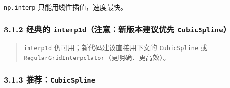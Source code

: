 \begin{Shaded}
\begin{Highlighting}[]
\NormalTok{[ 0.4  0.5 {-}0.9]}
\end{Highlighting}
\end{Shaded}

\texttt{np.interp} 只能用线性插值，速度最快。

\subsubsection{\texorpdfstring{3.1.2 经典的
\texttt{interp1d}（注意：新版本建议优先
\texttt{CubicSpline}）}{3.1.2 经典的 interp1d（注意：新版本建议优先 CubicSpline）}}\label{ux7ecfux5178ux7684-interp1dux6ce8ux610fux65b0ux7248ux672cux5efaux8baeux4f18ux5148-cubicspline}

\begin{Shaded}
\begin{Highlighting}[]
\OperatorTok{=}\OperatorTok{=}\NormalTok{)}
\OperatorTok{=}\OperatorTok{=}\NormalTok{)}
\NormalTok{(f\_lin([}\NormalTok{, }\NormalTok{, }\NormalTok{]), }\NormalTok{))}
\NormalTok{(f\_cub([}\NormalTok{, }\NormalTok{, }\NormalTok{]), }\NormalTok{))}
\end{Highlighting}
\end{Shaded}

\begin{Shaded}
\begin{Highlighting}[]
\NormalTok{[ 0.4  0.5 {-}0.9]}
\NormalTok{[ 0.4583  0.575  {-}1.0333]}
\end{Highlighting}
\end{Shaded}

\begin{quote}
\texttt{interp1d} 仍可用；新代码建议直接用下文的 \texttt{CubicSpline} 或
\texttt{RegularGridInterpolator}（更明确、更高效）。
\end{quote}

\subsubsection{\texorpdfstring{3.1.3
推荐：\texttt{CubicSpline}}{3.1.3 推荐：CubicSpline}}\label{ux63a8ux8350cubicspline}

